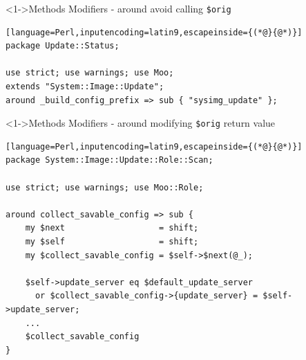 \documentclass[ngerman,xcolor={table,dvipsnames},smaller,compress,hyperref={bookmarks,colorlinks},handout]{beamer}%
\begin{document}
\begin{frame}[t,fragile]

\begin{block}<1->{Methods Modifiers - around avoid calling \texttt{\$orig}}
\scriptsize
\begin{lstlisting}[language=Perl,inputencoding=latin9,escapeinside={(*@}{@*)}]
package Update::Status;

use strict; use warnings; use Moo;
extends "System::Image::Update";
around _build_config_prefix => sub { "sysimg_update" };
\end{lstlisting}
\end{block}

\begin{itemize}
\end{itemize}

\end{frame}

\begin{frame}[t,fragile]

\begin{block}<1->{Methods Modifiers - around modifying \texttt{\$orig} return value}
\scriptsize
\begin{lstlisting}[language=Perl,inputencoding=latin9,escapeinside={(*@}{@*)}]
package System::Image::Update::Role::Scan;

use strict; use warnings; use Moo::Role;

around collect_savable_config => sub {
    my $next                   = shift;
    my $self                   = shift;
    my $collect_savable_config = $self->$next(@_);

    $self->update_server eq $default_update_server
      or $collect_savable_config->{update_server} = $self->update_server;
    ...
    $collect_savable_config
}
\end{lstlisting}
\end{block}

\begin{itemize}
\end{itemize}

\end{frame}
\end{document}
